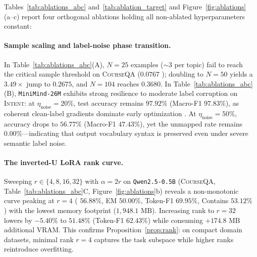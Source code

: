 \documentclass[10pt,a4paper,twocolumn]{article}
\begin{document}
Tables~\ref{tab:ablations_abc} and~\ref{tab:ablation_target} and Figure~\ref{fig:ablations}(a--c) report four orthogonal ablations holding all non-ablated hyperparameters constant:

\paragraph{Sample scaling and label-noise phase transition.}
In Table~\ref{tab:ablations_abc}(A), $N=25$ examples ($\sim 3$ per topic) fail to reach the critical sample threshold on \textsc{CourseQA} ($0.0767$ ); doubling to $N=50$ yields a $3.49\times$ jump to $0.2675$, and $N=104$ reaches $0.3680$. In Table~\ref{tab:ablations_abc}(B), \texttt{MiniMind-26M} exhibits strong resilience to moderate label corruption on \textsc{Intent}: at $\eta_{\text{noise}} = 20\%$, test accuracy remains $97.92\%$ (Macro-F1 $97.83\%$), as coherent clean-label gradients dominate early optimization \citep{arpit2017closer}. At $\eta_{\text{noise}} = 50\%$, accuracy drops to $56.77\%$ (Macro-F1 $47.43\%$), yet the unmapped rate remains $0.00\%$---indicating that output vocabulary syntax is preserved even under severe semantic label noise.

\paragraph{The inverted-U LoRA rank curve.}
Sweeping $r \in \{4, 8, 16, 32\}$ with $\alpha = 2r$ on \texttt{Qwen2.5-0.5B} (\textsc{CourseQA}, Table~\ref{tab:ablations_abc}C, Figure~\ref{fig:ablations}b) reveals a non-monotonic curve peaking at $r=4$ ( $56.88\%$, EM $50.00\%$, Token-F1 $69.95\%$, Contains $53.12\%$) with the lowest memory footprint ($1,948.1\text{ MB}$). Increasing rank to $r=32$ lowers  by $-5.40\%$ to $51.48\%$ (Token-F1 $62.43\%$) while consuming $+174.8\text{ MB}$ additional VRAM. This confirms Proposition~\ref{prop:rank}: on compact domain datasets, minimal rank $r=4$ captures the task subspace while higher ranks reintroduce overfitting.
\end{document}
